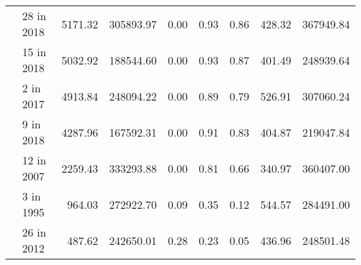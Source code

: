 \begin{tabular}{llrrrrrrr}
   & 28 in 2018 &                                     5171.32 &                                       305893.97 &                                          0.00 &                                               0.93 &                                        0.86 &                                             428.32 &                                        367949.84 \\
   & 15 in 2018 &                                     5032.92 &                                       188544.60 &                                          0.00 &                                               0.93 &                                        0.87 &                                             401.49 &                                        248939.64 \\
   & 2 in 2017 &                                     4913.84 &                                       248094.22 &                                          0.00 &                                               0.89 &                                        0.79 &                                             526.91 &                                        307060.24 \\
   & 9 in 2018 &                                     4287.96 &                                       167592.31 &                                          0.00 &                                               0.91 &                                        0.83 &                                             404.87 &                                        219047.84 \\
   & 12 in 2007 &                                     2259.43 &                                       333293.88 &                                          0.00 &                                               0.81 &                                        0.66 &                                             340.97 &                                        360407.00 \\
   & 3 in 1995 &                                      964.03 &                                       272922.70 &                                          0.09 &                                               0.35 &                                        0.12 &                                             544.57 &                                        284491.00 \\
   & 26 in 2012 &                                      487.62 &                                       242650.01 &                                          0.28 &                                               0.23 &                                        0.05 &                                             436.96 &                                        248501.48 \\

\end{tabular}
